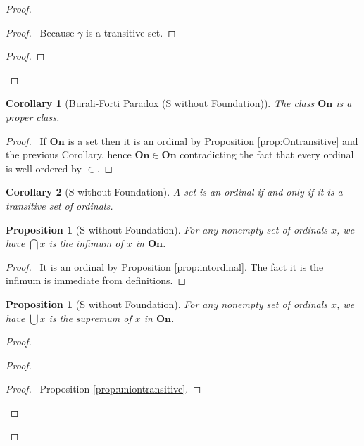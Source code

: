\documentclass{book}
\let\qed\relax
\newtheorem{prop}[ax]{Proposition}
\newtheorem{cor}{Corollary}[ax]
\theoremstyle{definition}
\begin{document}
\begin{proof}
\pf
{}
\begin{proof}
	\pf\ Because $\gamma$ is a transitive set.
\end{proof}
\begin{proof}
\end{proof}
\qed
\end{proof}

\begin{cor}[Burali-Forti Paradox (S without Foundation)]
The class $\mathbf{On}$ is a proper class.
\end{cor}

\begin{proof}
\pf\ If $\mathbf{On}$ is a set then it is an ordinal by Proposition \ref{prop:Ontransitive} and the previous Corollary, hence $\mathbf{On} \in \mathbf{On}$ contradicting the fact that every ordinal is well ordered by $\in$. \qed
\end{proof}

\begin{cor}[S without Foundation]
\label{cor:transords}
A set is an ordinal if and only if it is a transitive set of ordinals.
\end{cor}

\begin{prop}[S without Foundation]
For any nonempty set of ordinals $x$, we have $\bigcap x$ is the infimum of $x$ in $\mathbf{On}$.
\end{prop}

\begin{proof}
\pf\ It is an ordinal by Proposition \ref{prop:intordinal}. The fact it is the infimum is
immediate from definitions. \qed
\end{proof}

\begin{prop}[S without Foundation]
For any nonempty set of ordinals $x$, we have $\bigcup x$ is the supremum of $x$ in $\mathbf{On}$.
\end{prop}

\begin{proof}
\pf
{}
\begin{proof}
	\begin{proof}
		\pf\ Proposition \ref{prop:uniontransitive}.
	\end{proof}
\end{proof}
\qed
\end{proof}
\end{document}
